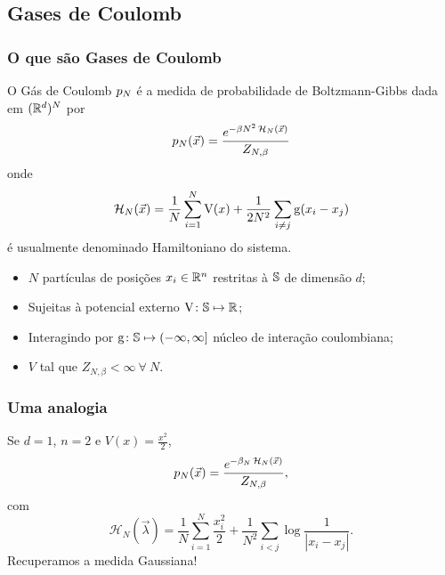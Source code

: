 \subsection{Gases de Coulomb}
\begin{frame}
	\frametitle{O que são Gases de Coulomb}
	O Gás de Coulomb $p_N$ é a medida de probabilidade de Boltzmann-Gibbs dada em $(\mathbb{R}^d)^N$ por
	\[
		p_N(\vec{x}) = \frac{e^{-\beta N^2 \operatorname{\mathcal{H}}_N(\vec{x})}}{Z_{N,\beta}}
	\] 
	onde 
	\[
		\operatorname{\mathcal{H}}_N(\vec{x}) = \frac{1}{N} \sum_{i = 1}^{N} \operatorname{V}(x) + \frac{1}{2N^2} \sum_{i \neq j} \operatorname{g}(x_i - x_j)
	\]
	é usualmente denominado Hamiltoniano do sistema. \cite{ChafaCoulombMeasure}
\end{frame}
\begin{frame}
	\begin{itemize}
	\item $N$ partículas de posições $x_i \in \mathbb{R}^n$ restritas à $\mathbb{S}$ de dimensão $d$;
	\pause
	\item Sujeitas à potencial externo $\operatorname{V} \colon \mathbb{S} \mapsto \mathbb{R}$;
	\pause
	\item Interagindo por $\operatorname{g} \colon \mathbb{S} \mapsto (-\infty, \infty]$ núcleo de interação coulombiana;
	\pause
	\item $V$ tal que  $Z_{N, \beta} < \infty \ \forall \ N$.
	\end{itemize}
\end{frame}
\begin{frame}
	\frametitle{Uma analogia}	
	Se $d = 1$, $n=2$ e $V(x) = \frac{x^2}{2}$,
	\pause
	\[
	p_N(\vec{x}) = \frac{e^{-\beta_N \operatorname{\mathcal{H}}_N(\vec{x})}}{Z_{N,\beta}},
	\]
	com 
	\[
	\mathcal{H}_N(\vec{\lambda}) = \frac{1}{N}\sum_{i = 1}^{N} \frac{x_i^2}{2} + \frac{1}{N^2} \sum_{i < j} \log{\frac{1}{|x_i - x_j|}}.
	\]
	Recuperamos a medida Gaussiana!
\end{frame}

